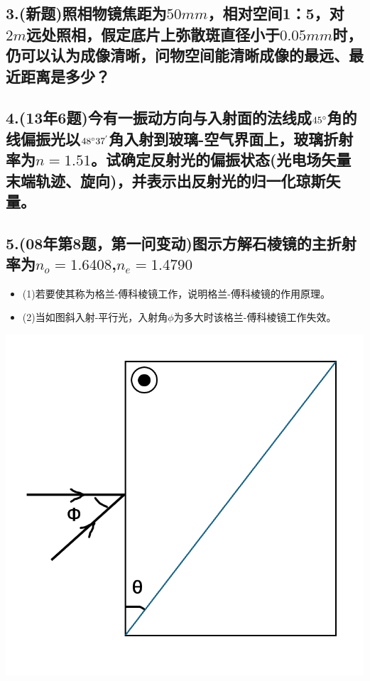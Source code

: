 \documentclass[11pt,a4paper]{article}
\begin{document}
    \subsection*{3.(新题)照相物镜焦距为$50mm$，相对空间1：5，对$2m$远处照相，假定底片上弥散斑直径小于$0.05mm$时，仍可以认为成像清晰，问物空间能清晰成像的最远、最近距离是多少？}
    \vspace{20mm}
    \subsection*{4.(13年6题)今有一振动方向与入射面的法线成$45\degree$角的线偏振光以$48\degree37^{'}$角入射到玻璃-空气界面上，玻璃折射率为$n=1.51$。试确定反射光的偏振状态(光电场矢量末端轨迹、旋向)，并表示出反射光的归一化琼斯矢量。}
    \vspace{20mm}
    \subsection*{5.(08年第8题，第一问变动)图示方解石棱镜的主折射率为$n_o=1.6408$,$n_e=1.4790$}
    \begin{itemize}
        \item (1)若要使其称为格兰-傅科棱镜工作，说明格兰-傅科棱镜的作用原理。
        \vspace{-3mm}
        \item (2)当如图斜入射-平行光，入射角$\phi $为多大时该格兰-傅科棱镜工作失效。
        \vspace{-3mm}
    \end{itemize}
    \includegraphics[scale=0.3]{4.png}
    \vspace{20mm}
\end{document}
